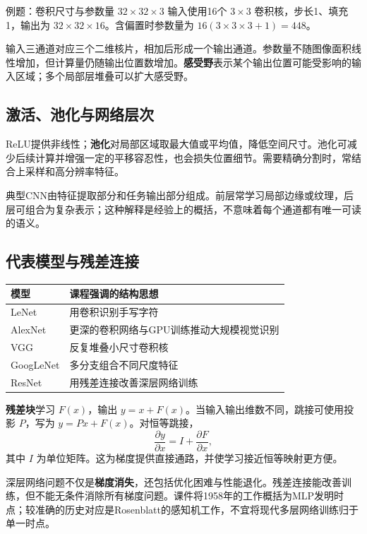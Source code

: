 \documentclass[UTF8,fontset=none,zihao=-4,a4paper]{ctexart}
\newcommand{\term}[1]{\textbf{#1}}
\begin{document}
\begin{infobox}{例题：卷积尺寸与参数量}
$32\times32\times3$ 输入使用16个 $3\times3$ 卷积核，步长1、填充1，输出为 $32\times32\times16$。含偏置时参数量为 $16(3\times3\times3+1)=448$。
\end{infobox}
输入三通道对应三个二维核片，相加后形成一个输出通道。参数量不随图像面积线性增加，但计算量仍随输出位置数增加。\term{感受野}表示某个输出位置可能受影响的输入区域；多个局部层堆叠可以扩大感受野。

\subsection{激活、池化与网络层次}
ReLU提供非线性；\term{池化}对局部区域取最大值或平均值，降低空间尺寸。池化可减少后续计算并增强一定的平移容忍性，也会损失位置细节。需要精确分割时，常结合上采样和高分辨率特征。

典型CNN由特征提取部分和任务输出部分组成。前层常学习局部边缘或纹理，后层可组合为复杂表示；这种解释是经验上的概括，不意味着每个通道都有唯一可读的语义。

\subsection{代表模型与残差连接}
\begin{center}\begin{tabularx}{\linewidth}{lY}
\toprule 模型 & 课程强调的结构思想\\\midrule
LeNet & 用卷积识别手写字符\\
AlexNet & 更深的卷积网络与GPU训练推动大规模视觉识别\\
VGG & 反复堆叠小尺寸卷积核\\
GoogLeNet & 多分支组合不同尺度特征\\
ResNet & 用残差连接改善深层网络训练\\\bottomrule
\end{tabularx}\end{center}
\term{残差块}学习 $F(x)$，输出 $y=x+F(x)$。当输入输出维数不同，跳接可使用投影 $P$，写为 $y=Px+F(x)$。对恒等跳接，
\[
\frac{\partial y}{\partial x}=I+\frac{\partial F}{\partial x},
\]
其中 $I$ 为单位矩阵。这为梯度提供直接通路，并使学习接近恒等映射更方便。

深层网络问题不仅是\term{梯度消失}，还包括优化困难与性能退化。残差连接能改善训练，但不能无条件消除所有梯度问题。课件将1958年的工作概括为MLP发明时点；较准确的历史对应是Rosenblatt的感知机工作，不宜将现代多层网络训练归于单一时点。
\end{document}
